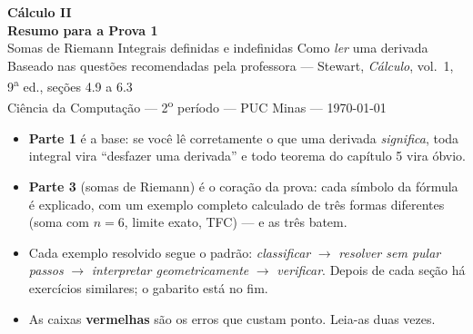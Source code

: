 \thispagestyle{empty}
\begin{center}
\vspace*{1.2cm}
{\sffamily\bfseries\Huge Cálculo II}\\[6pt]
{\sffamily\bfseries\LARGE Resumo para a Prova 1}\\[18pt]
{\sffamily\large Somas de Riemann \;\textperiodcentered\; Integrais definidas e indefinidas \;\textperiodcentered\; Como \emph{ler} uma derivada}\\[8pt]
{\small Baseado nas questões recomendadas pela professora --- Stewart, \emph{Cálculo}, vol.~1, 9\textsuperscript{a} ed., seções 4.9 a 6.3}\\[4pt]
{\small Ciência da Computação --- 2\textsuperscript{o} período --- PUC Minas --- \today}
\end{center}

\vspace{0.6cm}

\begin{tcolorbox}[base, colback=azulclaro, colframe=azul, title={Como usar este resumo}]
\begin{itemize}[leftmargin=1.4em, itemsep=2pt]
\item \textbf{Parte 1} é a base: se você lê corretamente o que uma derivada \emph{significa}, toda integral vira ``desfazer uma derivada'' e todo teorema do capítulo 5 vira óbvio.
\item \textbf{Parte 3} (somas de Riemann) é o coração da prova: cada símbolo da fórmula é explicado, com um exemplo completo calculado de três formas diferentes (soma com $n=6$, limite exato, TFC) --- e as três batem.
\item Cada exemplo resolvido segue o padrão: \emph{classificar} $\to$ \emph{resolver sem pular passos} $\to$ \emph{interpretar geometricamente} $\to$ \emph{verificar}. Depois de cada seção há exercícios similares; o gabarito está no fim.
\item As caixas \textcolor{vermelho}{\textbf{vermelhas}} são os erros que custam ponto. Leia-as duas vezes.
\end{itemize}
\end{tcolorbox}

\tableofcontents
\newpage
